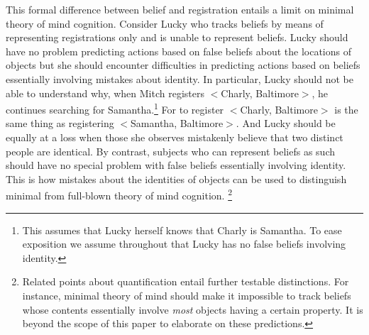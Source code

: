 \documentclass[12pt,\papersize]{extarticle}
\begin{document}
This formal difference between belief and registration entails a limit on minimal theory of mind cognition.  Consider Lucky who tracks beliefs by means of representing registrations only and is unable to represent beliefs. Lucky should have no problem predicting actions based on false beliefs about the locations of objects but she should encounter difficulties in predicting actions based on beliefs essentially involving mistakes about identity.  In particular, Lucky should not be able to understand why, when Mitch registers \(<\)Charly, Baltimore\(>\), he continues searching for Samantha.\footnote{ 	This assumes that Lucky herself knows that Charly is Samantha.  To ease exposition we assume throughout that Lucky has no false beliefs involving identity.}  For to register \(<\)Charly, Baltimore\(>\) is the same thing as registering \(<\)Samantha, Baltimore\(>\). And Lucky should be equally at a loss when those she observes mistakenly believe that two distinct people are identical.  By contrast, subjects who can represent beliefs as such should have no special problem with false beliefs essentially involving identity.  This is how mistakes about the identities of objects can be used to distinguish minimal from full-blown theory of mind cognition.%
\footnote{ 	
Related points about quantification entail further testable distinctions.  For instance, minimal theory of mind should make it impossible to track beliefs whose contents essentially involve \textit{most} objects having a certain property.  It is beyond the scope of this paper to elaborate on these predictions.
}
\end{document}

